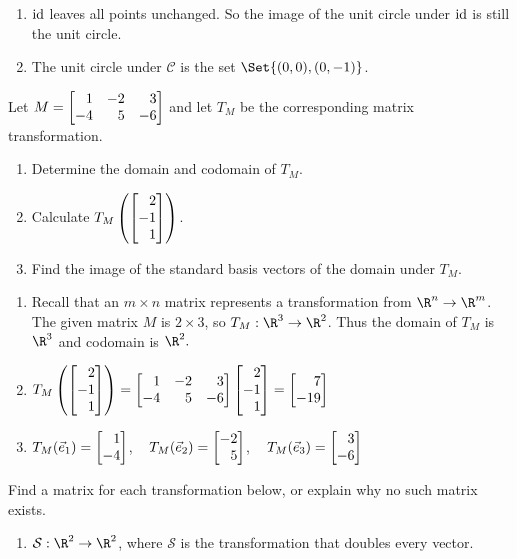 \begin{exercises}
\begin{problist}
\begin{solution}
\begin{enumerate}
				\item $\operatorname{\operatorname{id}}$ leaves all points unchanged. So the image of the unit
					circle under $\operatorname{\operatorname{id}}$ is still the unit circle.

				\item The unit circle under $\mathcal{C}$ is the set
					$\Set{(0,0), (0,-1)}$.
			\end{enumerate}
		\end{solution}

		\prob Let $M=\mat{1&-2&3\\-4&5&-6}$ and let $T_{M}$ be the corresponding
		matrix transformation.
		\begin{enumerate}
			\item Determine the domain and codomain of $T_{M}$.

			\item Calculate $T_{M}\left(\mat{2\\-1\\1}\right)$.

			\item Find the image of the standard basis vectors of the domain
				under $T_{M}$.
		\end{enumerate}
		\begin{solution}
			\begin{enumerate}
				\item Recall that an $m \times n$ matrix represents a
					transformation from $\R^{n}\rightarrow \R^{m}$. The given matrix
					$M$ is $2 \times 3$, so $T_{M}: \R^{3}\rightarrow \R^{2}$. Thus
					the domain of $T_{M}$ is $\R^{3}$ and codomain is $\R^{2}.$

				\item
					$T_{M}\left( \mat{2\\-1\\1}\right) = \mat
					{1 & -2 & 3 \\ -4 & 5 & -6}\mat{2\\-1\\1}= \mat{7\\ -19}$

				\item $T_{M}(\vec{e}_{1}) = \mat{1\\-4}$, $\;\;\; T_{M}(\vec{e}
					_{2}) = \mat{-2 \\ 5}$,
					$\;\;\; T_{M}(\vec{e}_{3}) = \mat{3\\-6}$
			\end{enumerate}
		\end{solution}

		\prob Find a matrix for each transformation below, or explain why no such
		matrix exists.
		\begin{enumerate}
			\item $\mathcal{S}:\R^{2}\to\R^{2}$, where $\mathcal{S}$ is the transformation
				that doubles every vector.


\end{enumerate}
\end{problist}
\end{exercises}
